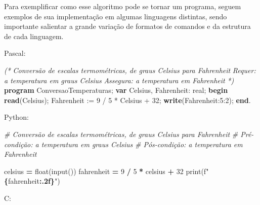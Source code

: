 \documentclass[
  11pt,
  a4paper,
]{scrbook}
\newenvironment{Shaded}{\begin{snugshade}}{\end{snugshade}}
\newcommand{\BuiltInTok}[1]{#1}
\newcommand{\CommentTok}[1]{\textcolor[rgb]{0.56,0.35,0.01}{\textit{#1}}}
\newcommand{\DataTypeTok}[1]{\textcolor[rgb]{0.13,0.29,0.53}{#1}}
\newcommand{\DecValTok}[1]{\textcolor[rgb]{0.00,0.00,0.81}{#1}}
\newcommand{\KeywordTok}[1]{\textcolor[rgb]{0.13,0.29,0.53}{\textbf{#1}}}
\newcommand{\NormalTok}[1]{#1}
\newcommand{\OperatorTok}[1]{\textcolor[rgb]{0.81,0.36,0.00}{\textbf{#1}}}
\newcommand{\SpecialCharTok}[1]{\textcolor[rgb]{0.81,0.36,0.00}{\textbf{#1}}}
\newcommand{\SpecialStringTok}[1]{\textcolor[rgb]{0.31,0.60,0.02}{#1}}
\begin{document}
Para exemplificar como esse algoritmo pode se tornar um programa, seguem
exemplos de sua implementação em algumas linguagens distintas, sendo
importante salientar a grande variação de formatos de comandos e da
estrutura de cada linguagem.

Pascal:

\begin{Shaded}
\begin{Highlighting}[]
\CommentTok{(*}
\CommentTok{Conversão de escalas termométricas, de graus Celsius para Fahrenheit}
\CommentTok{Requer: a temperatura em graus Celsius}
\CommentTok{Assegura: a temperatura em Fahrenheit}
\CommentTok{*)}
\KeywordTok{program}\NormalTok{ ConversaoTemperaturas;}
\KeywordTok{var}
\NormalTok{    Celsius, Fahrenheit: }\DataTypeTok{real}\NormalTok{;}
\KeywordTok{begin}
    \KeywordTok{read}\NormalTok{(Celsius);}
\NormalTok{    Fahrenheit := }\DecValTok{9}\NormalTok{ / }\DecValTok{5}\NormalTok{ * Celsius + }\DecValTok{32}\NormalTok{;}
    \KeywordTok{write}\NormalTok{(Fahrenheit:}\DecValTok{5}\NormalTok{:}\DecValTok{2}\NormalTok{);}
\KeywordTok{end}\NormalTok{.}
\end{Highlighting}
\end{Shaded}

Python:

\begin{Shaded}
\begin{Highlighting}[]
\CommentTok{\# Conversão de escalas termométricas, de graus Celsius para Fahrenheit}
\CommentTok{\# Pré{-}condição: a temperatura em graus Celsius}
\CommentTok{\# Pós{-}condição: a temperatura em Fahrenheit}

\NormalTok{celsius }\OperatorTok{=} \BuiltInTok{float}\NormalTok{(}\BuiltInTok{input}\NormalTok{())}
\NormalTok{fahrenheit }\OperatorTok{=} \DecValTok{9} \OperatorTok{/} \DecValTok{5} \OperatorTok{*}\NormalTok{ celsius }\OperatorTok{+} \DecValTok{32}
\BuiltInTok{print}\NormalTok{(}\SpecialStringTok{f"}\SpecialCharTok{\{}\NormalTok{fahrenheit}\SpecialCharTok{:.2f\}}\SpecialStringTok{"}\NormalTok{)}
\end{Highlighting}
\end{Shaded}

C:
\end{document}
